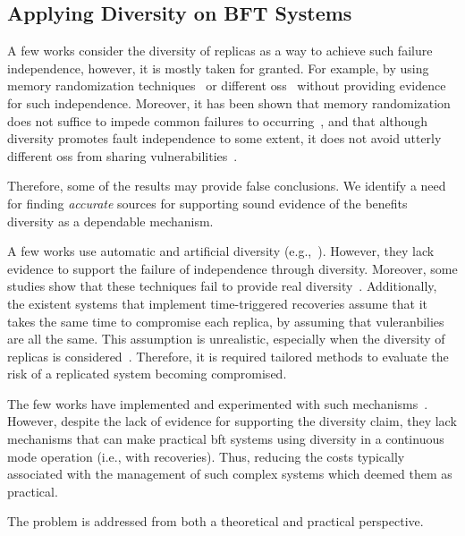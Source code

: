 \subsection{Applying Diversity on BFT Systems}

A few works consider the diversity of replicas as a way to achieve such failure independence, however, it is mostly taken for granted.
For example, by using memory randomization techniques~\cite{Roeder:2010} or different \glspl{os}~\cite{Rodrigues:2001,Junqueira:2005} without providing evidence for such independence. 
Moreover, it has been shown that memory randomization does not suffice to impede common failures to occurring~\cite{Snow:2013,Bittau:2014}, and that although diversity promotes fault independence to some extent, it does not avoid utterly different \glspl{os} from sharing vulnerabilities~\cite{Garcia:2014}.


Therefore, some of the results may provide false conclusions.
We identify a need for finding \emph{accurate} sources for supporting sound evidence of the benefits diversity as a dependable mechanism.

A few works use automatic and artificial diversity (e.g.,~\cite{Roeder:2010,Amir:2011}). 
However, they lack evidence to support the failure of independence through diversity. 
Moreover, some studies show that these techniques fail to provide real diversity~\cite{Snow:2013,Bittau:2014}. 
Additionally, the existent systems that implement time-triggered recoveries assume that it takes the same time to compromise each replica, by assuming that vuleranbilies are all the same. 
This assumption is unrealistic, especially when the diversity of replicas is considered~\cite{Nayak:2014}. 
Therefore, it is required tailored methods to evaluate the risk of a replicated system becoming compromised.


The few works have implemented and experimented with such mechanisms~\cite{Rodrigues:2001,Roeder:2010,Amir:2011}. 
However, despite the lack of evidence for supporting the diversity claim, they lack mechanisms that can make practical \gls{bft} systems using diversity in a continuous mode operation (i.e., with recoveries).  
Thus, reducing the costs typically associated with the management of such complex systems which deemed them as practical.


The problem is addressed from both a theoretical and practical perspective.


